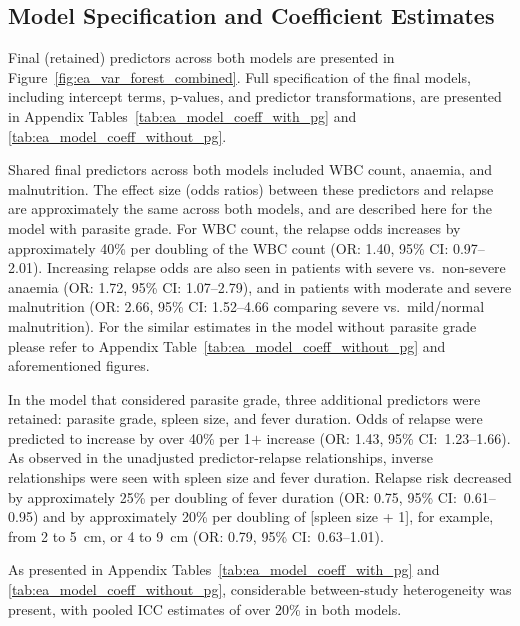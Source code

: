 \subsection{Model Specification and Coefficient Estimates}

Final (retained) predictors across both models are presented in Figure~\ref{fig:ea_var_forest_combined}. Full specification of the final models, including intercept terms, p-values, and predictor transformations, are presented in Appendix Tables~\ref{tab:ea_model_coeff_with_pg} and \ref{tab:ea_model_coeff_without_pg}.

Shared final predictors across both models included WBC count, anaemia, and malnutrition. The effect size (odds ratios) between these predictors and relapse are approximately the same across both models, and are described here for the model with parasite grade. For WBC count, the relapse odds increases by approximately 40\% per doubling of the WBC count (OR: 1.40, 95\% CI: 0.97--2.01). Increasing relapse odds are also seen in patients with severe vs.\ non-severe anaemia (OR: 1.72, 95\% CI: 1.07--2.79), and in patients with moderate and severe malnutrition (OR: 2.66, 95\% CI: 1.52--4.66 comparing severe vs.\ mild/normal malnutrition). For the similar estimates in the model without parasite grade please refer to Appendix Table~\ref{tab:ea_model_coeff_without_pg} and aforementioned figures.

In the model that considered parasite grade, three additional predictors were retained: parasite grade, spleen size, and fever duration. Odds of relapse were predicted to increase by over 40\% per 1$+$ increase (OR: 1.43, 95\% CI:~1.23--1.66). As observed in the unadjusted predictor-relapse relationships, inverse relationships were seen with spleen size and fever duration. Relapse risk decreased by approximately 25\% per doubling of fever duration (OR: 0.75, 95\% CI:~0.61--0.95) and by approximately 20\% per doubling of [spleen size + 1], for example, from 2 to 5~cm, or 4 to 9~cm (OR: 0.79, 95\% CI:~0.63--1.01).


As presented in Appendix Tables~\ref{tab:ea_model_coeff_with_pg} and \ref{tab:ea_model_coeff_without_pg}, considerable between-study heterogeneity was present, with pooled ICC estimates of over 20\% in both models.

